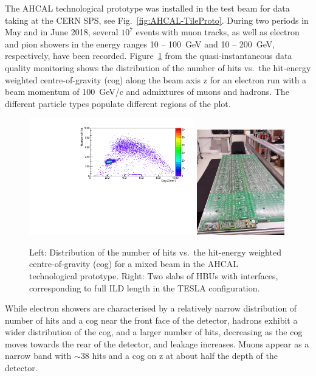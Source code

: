 The AHCAL technological prototype was installed in the test beam for data taking at the CERN SPS, see Fig.~\ref{fig:AHCAL-TileProto}.
During two periods in May and in June 2018, several $10^7$ events with muon tracks, as well as electron and pion showers in the energy ranges  10 -- 100~GeV and 10 -- 200~GeV, respectively, have been recorded. 
Figure~\ref{fig:AHCAL-nhit-longslab} from the quasi-instantaneous data quality monitoring shows the distribution of the number of hits vs.\ the hit-energy weighted centre-of-gravity (cog) along the beam axis z for an electron run with a beam momentum of 100~GeV/c and admixtures of muons and hadrons. The different particle types populate different regions of the plot.
\begin{figure}[hbt]
\centering
\includegraphics[width=0.64\textwidth]{Detector/fig/AHCAL-cogz_nhits.pdf}
\includegraphics[width=0.34\textwidth]{Detector/fig/AHCAL-LomgSlab.jpeg}
\caption{Left: Distribution of the number of hits vs.\ the hit-energy weighted centre-of-gravity (cog) for a mixed beam in the AHCAL technological prototype. Right: Two slabs of HBUs with interfaces, corresponding to full ILD length in the TESLA configuration.} 
\label{fig:AHCAL-nhit-longslab}
\end{figure}
%
While electron showers are characterised by a relatively narrow distribution of number of hits and a cog near the front face of the detector, hadrons exhibit a wider distribution of the cog, and a larger number of hits, decreasing as the cog moves towards the rear of the detector, and leakage increases.
Muons appear as a narrow band with $\sim 38$ hits and a cog on z at about half the depth of the detector. 

